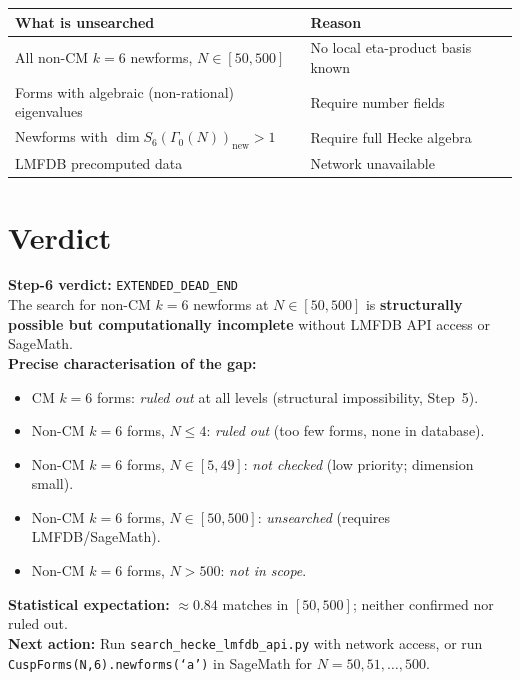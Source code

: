 \documentclass[12pt,a4paper]{article}
\theoremstyle{definition}
\theoremstyle{remark}
\begin{document}
\begin{center}
\begin{tabular}{ll}
  \toprule
  \textbf{What is unsearched} & \textbf{Reason} \\
  \midrule
  All non-CM $k=6$ newforms, $N \in [50,500]$ & No local eta-product basis known \\
  Forms with algebraic (non-rational) eigenvalues & Require number fields \\
  Newforms with $\dim S_6(\Gamma_0(N))_{\mathrm{new}} > 1$ & Require full Hecke algebra \\
  LMFDB precomputed data & Network unavailable \\
  \bottomrule
\end{tabular}
\end{center}

\section{Verdict}
\label{sec:verdict}

\begin{center}
  \colorbox{warnblue!15}{%
    \parbox{0.88\textwidth}{%
      \textbf{Step-6 verdict:} \texttt{EXTENDED\_DEAD\_END}\\[4pt]
      The search for non-CM $k=6$ newforms at $N \in [50,500]$ is
      \textbf{structurally possible but computationally incomplete}
      without LMFDB API access or SageMath.\\[4pt]
      \textbf{Precise characterisation of the gap:}
      \begin{itemize}
        \item CM $k=6$ forms: \emph{ruled out} at all levels (structural impossibility, Step~5).
        \item Non-CM $k=6$ forms, $N \le 4$: \emph{ruled out} (too few forms, none in database).
        \item Non-CM $k=6$ forms, $N \in [5, 49]$: \emph{not checked} (low priority; dimension small).
        \item Non-CM $k=6$ forms, $N \in [50, 500]$: \emph{unsearched} (requires LMFDB/SageMath).
        \item Non-CM $k=6$ forms, $N > 500$: \emph{not in scope}.
      \end{itemize}
      \textbf{Statistical expectation:} $\approx 0.84$ matches in $[50,500]$;
      neither confirmed nor ruled out.\\[4pt]
      \textbf{Next action:}  Run \texttt{search\_hecke\_lmfdb\_api.py}
      with network access, or run \texttt{CuspForms(N,6).newforms(`a')}
      in SageMath for $N = 50, 51, \ldots, 500$.}}
\end{center}
\end{document}
